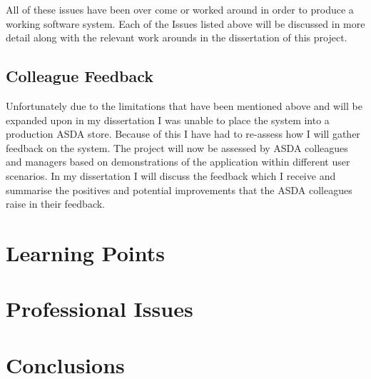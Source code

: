 \documentclass[a4paper,11pt]{report}
\begin{document}
All of these issues have been over come or worked around in order to produce a working software system. Each of the Issues listed above will be discussed in more detail along with the relevant work arounds in the dissertation of this project.


\section{Colleague Feedback}
Unfortunately due to the limitations that have been mentioned above and will be expanded upon in my dissertation I was unable to place the system into a production ASDA store.
Because of this I have had to re-assess how I will gather feedback on the system. The project will now be assessed by ASDA colleagues and managers based on demonstrations of the application within different user scenarios. 
In my dissertation I will discuss the feedback which I receive and summarise the positives and potential improvements that the ASDA colleagues raise in their feedback.

\chapter{Learning Points}

\chapter{Professional Issues}

\chapter{Conclusions}







\newpage
{}
\begin{appendix}
\end{appendix}
\end{document}
